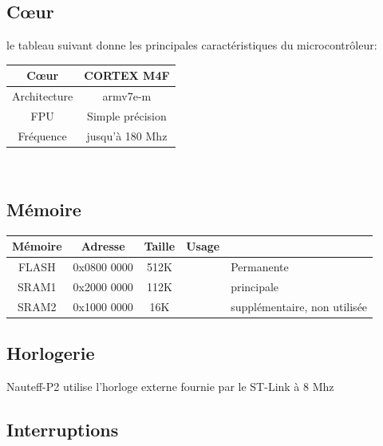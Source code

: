 \documentclass[a4paper,11pt]{report}
\begin{document}
\subsection{Cœur}

le tableau suivant donne les principales caractéristiques du microcontrôleur:
\\
\begin{tabular}{|c|c|}
	\hline 
	Cœur& CORTEX M4F  \\ 
	\hline 
	Architecture & armv7e-m \\ 
	\hline 
	FPU & Simple précision \\
	\hline 
	Fréquence & jusqu'à 180 Mhz \\ 
	\hline 
\end{tabular} 
\\
\subsection{Mémoire}

\begin{tabular}{|c|c|c|c|p{5cm}|}
	\hline 
	Mémoire & Adresse     & Taille & Usage &  \\ 
	\hline 
	FLASH   & 0x0800 0000 & 512K &  &  Permanente \\ 
	SRAM1   & 0x2000 0000 & 112K &  &  principale \\ 
	SRAM2   & 0x1000 0000 &  16K &  &  supplémentaire, non utilisée\\ 
	\hline
\end{tabular}

\subsection{Horlogerie}
Nauteff-P2 utilise l'horloge externe fournie par le ST-Link à 8 Mhz

\subsection{Interruptions}
\end{document}
